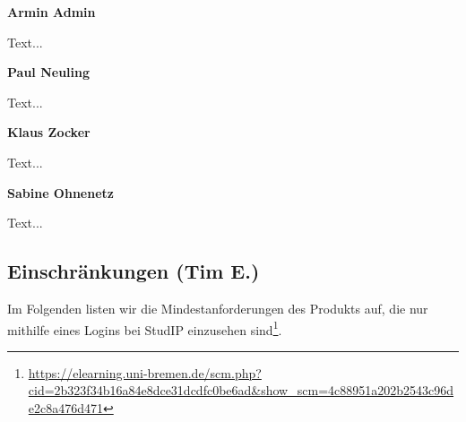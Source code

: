 \documentclass[fontsize=12pt,paper=a4,twoside]{scrartcl}
\begin{document}
    \textbf{Armin Admin}
    
    Text...
    
    \textbf{Paul Neuling}
    
    Text...
    
    \textbf{Klaus Zocker}
    
    Text...
    
    \textbf{Sabine Ohnenetz}
    
    Text...
  
  \subsection{Einschränkungen (Tim E.)}

Im Folgenden listen wir die Mindestanforderungen des Produkts auf, die nur mithilfe eines Logins bei StudIP einzusehen sind\footnote{\url{https://elearning.uni-bremen.de/scm.php?cid=2b323f34b16a84e8dce31dcdfc0be6ad\&show\_scm=4c88951a202b2543c96de2c8a476d471}}.
\end{document}
